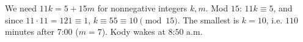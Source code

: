 We need $11k=5+15m$ for nonnegative integers $k,m$. Mod $15$: $11k\equiv5$, and since $11\cdot11=121\equiv1$, $k\equiv55\equiv10\pmod{15}$. The smallest is $k=10$, i.e. $110$ minutes after 7:00 ($m=7$). Kody wakes at $\boxed{\text{8:50 a.m.}}$

